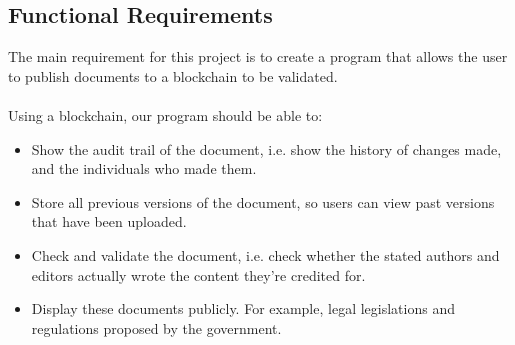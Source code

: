 \newpage
\subsection{Functional Requirements}
The main requirement for this project is to create a program that allows the user to publish documents 
to a blockchain to be validated.
\\ \\Using a blockchain, our program should be able to:

\begin{itemize}
    \item Show the audit trail of the document, i.e. show the history of changes made, and the individuals who made them.
    \item Store all previous versions of the document, so users can view past versions that have been uploaded.
    \item Check and validate the document, i.e. check whether the stated authors and editors actually wrote 
		  the content they’re credited for.
    \item Display these documents publicly. For example, legal legislations and regulations proposed by the government.
\end{itemize}
